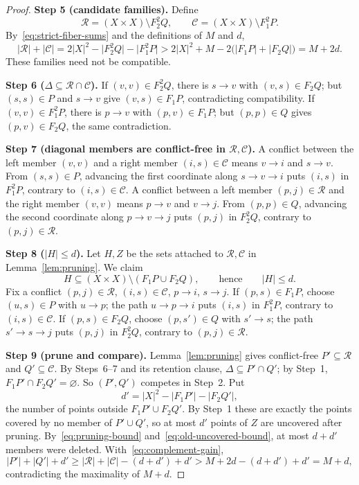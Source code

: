 \documentclass[11pt]{article}
\theoremstyle{remark}
\newcommand{\abs}[1]{\lvert #1\rvert}
\newcommand{\step}[1]{\par\smallskip\noindent\textbf{Step #1.}}
\newcommand{\cR}{\mathcal R}
\newcommand{\cC}{\mathcal C}
\begin{document}
\begin{proof}
\step{5 (candidate families)} Define
\[
 \cR=(X\times X)\setminus F_2^2Q,\qquad\cC=(X\times X)\setminus F_1^2P.
\]
By~\eqref{eq:strict-fiber-sums} and the definitions of $M$ and $d$,
\begin{equation}\label{eq:complement-gain}
 \abs{\cR}+\abs{\cC}=2\abs{X}^2-\abs{F_2^2Q}-\abs{F_1^2P}
 >2\abs{X}^2+M-2\bigl(\abs{F_1P}+\abs{F_2Q}\bigr)=M+2d.
\end{equation}
These families need not be compatible.

\step{6 ($\Delta\subseteq\cR\cap\cC$)} If $(v,v)\in F_2^2Q$, there is
$s\to v$ with $(v,s)\in F_2Q$; but $(s,s)\in P$ and $s\to v$ give
$(v,s)\in F_1P$, contradicting compatibility. If $(v,v)\in F_1^2P$, there is
$p\to v$ with $(p,v)\in F_1P$; but $(p,p)\in Q$ gives $(p,v)\in F_2Q$, the same
contradiction.

\step{7 (diagonal members are conflict-free in $\cR,\cC$)} A conflict between
the left member $(v,v)$ and a right member $(i,s)\in\cC$ means $v\to i$ and
$s\to v$. From $(s,s)\in P$, advancing the first coordinate along
$s\to v\to i$ puts $(i,s)$ in $F_1^2P$, contrary to $(i,s)\in\cC$. A conflict
between a left member $(p,j)\in\cR$ and the right member $(v,v)$ means
$p\to v$ and $v\to j$. From $(p,p)\in Q$, advancing the second coordinate along
$p\to v\to j$ puts $(p,j)$ in $F_2^2Q$, contrary to $(p,j)\in\cR$.

\step{8 ($\abs H\le d$)} Let $H,Z$ be the sets attached to $\cR,\cC$ in
Lemma~\ref{lem:pruning}. We claim
\begin{equation}\label{eq:old-uncovered-bound}
 H\subseteq(X\times X)\setminus(F_1P\cup F_2Q),\qquad\text{hence}\qquad\abs{H}\le d.
\end{equation}
Fix a conflict $(p,j)\in\cR$, $(i,s)\in\cC$, $p\to i$, $s\to j$. If
$(p,s)\in F_1P$, choose $(u,s)\in P$ with $u\to p$; the path $u\to p\to i$
puts $(i,s)$ in $F_1^2P$, contrary to $(i,s)\in\cC$. If $(p,s)\in F_2Q$,
choose $(p,s')\in Q$ with $s'\to s$; the path $s'\to s\to j$ puts $(p,j)$ in
$F_2^2Q$, contrary to $(p,j)\in\cR$.

\step{9 (prune and compare)} Lemma~\ref{lem:pruning} gives conflict-free
$P'\subseteq\cR$ and $Q'\subseteq\cC$. By Steps~6--7 and its retention clause,
$\Delta\subseteq P'\cap Q'$; by Step~1, $F_1P'\cap F_2Q'=\varnothing$. So
$(P',Q')$ competes in Step~2. Put
\[
 d'=\abs{X}^2-\abs{F_1P'}-\abs{F_2Q'},
\]
the number of points outside $F_1P'\cup F_2Q'$. By Step~1 these are exactly the
points covered by no member of $P'\cup Q'$, so at most $d'$ points of $Z$ are
uncovered after pruning. By~\eqref{eq:pruning-bound}
and~\eqref{eq:old-uncovered-bound}, at most $d+d'$ members were deleted.
With~\eqref{eq:complement-gain},
\[
 \abs{P'}+\abs{Q'}+d'\ge\abs{\cR}+\abs{\cC}-(d+d')+d'>M+2d-(d+d')+d'=M+d,
\]
contradicting the maximality of $M+d$.
\end{proof}
\end{document}
